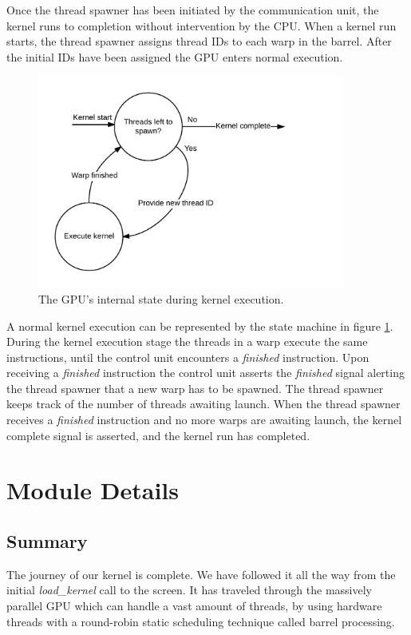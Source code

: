 \documentclass[../main/report.tex]{subfiles}
\begin{document}
Once the thread spawner has been initiated by the communication unit, the kernel runs to completion without intervention by the CPU. 
When a kernel run starts, the thread spawner assigns thread IDs to each warp in the barrel.
After the initial IDs have been assigned the GPU enters normal execution.
\begin{figure}[H]
    \centering
    \includegraphics[width=0.9\textwidth]{../gpu/diagrams/kernel_run_state_machine.png}
    \caption{The GPU's internal state during kernel execution.}
    \label{fig:kernel_run_state_machine}
\end{figure}
A normal kernel execution can be represented by the state machine in figure \ref{fig:kernel_run_state_machine}.
During the kernel execution stage the threads in a warp execute the same instructions, until the control unit encounters a \emph{finished} instruction.
Upon receiving a \emph{finished} instruction the control unit asserts the \emph{finished} signal alerting the thread spawner that a new warp has to be spawned.
The thread spawner keeps track of the number of threads awaiting launch.
When the thread spawner receives a \emph{finished} instruction and no more warps are awaiting launch, the kernel complete signal is asserted, and the kernel run has completed.


\section{Module Details}













\subsection{Summary}
The journey of our kernel is complete.
We have followed it all the way from the initial \emph{load\_kernel} call to the screen.
It has traveled through the massively parallel GPU which can handle a vast amount of threads,
by using hardware threads with a round-robin static scheduling technique called barrel processing.
\end{document}
